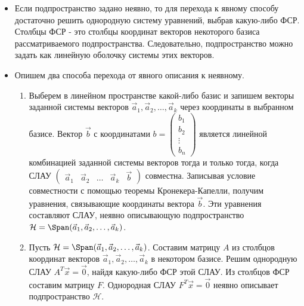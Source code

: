 \begin{itemize}
    \item Если подпространство задано неявно, то для перехода к явному способу достаточно решить однородную систему уравнений, выбрав какую-либо ФСР. Столбцы ФСР - это столбцы координат векторов некоторого базиса рассматриваемого подпространства. Следовательно, подпространство можно задать как линейную оболочку системы этих векторов.
    \item Опишем два способа перехода от явного описания к неявному.

    \begin{enumerate}
        \item Выберем в линейном пространстве какой-либо базис и запишем векторы заданной системы векторов $\vec{a}_1, \vec{a}_2, \ldots, \vec{a}_k$ через координаты в выбранном базисе. Вектор $\vec{b}$ с координатами $b = \begin{pmatrix}
            b_1 \\
            b_2 \\
            \vdots \\
            b_n
        \end{pmatrix}$ является линейной комбинацией заданной системы векторов тогда и только тогда, когда СЛАУ $\begin{pmatrix}
            \vec{a}_1 & \vec{a}_2 & \ldots & \vec{a}_k & \vec{b}
        \end{pmatrix}$ совместна. Записывая условие совместности с помощью теоремы Кронекера-Капелли, получим уравнения, связывающие координаты вектора $\vec{b}$. Эти уравнения составляют СЛАУ, неявно описывающую подпространство $\mathcal{H} = \Span(\vec{a}_1, \vec{a}_2, \ldots, \vec{a}_k)$.
    
    \item Пусть $\mathcal{H} = \Span(\vec{a}_1, \vec{a}_2, \ldots, \vec{a}_k)$. Составим матрицу $A$ из столбцов координат векторов $\vec{a}_1, \vec{a}_2, \ldots, \vec{a}_k$ в некотором базисе. Решим однородную СЛАУ $A^T\vec{x} = \vec{0}$, найдя какую-либо ФСР этой СЛАУ. Из столбцов ФСР составим матрицу $F$. Однородная СЛАУ $F^T\vec{x} = \vec{0}$ неявно описывает подпространство $\mathcal{H}$.
    \end{enumerate}
\end{itemize}
